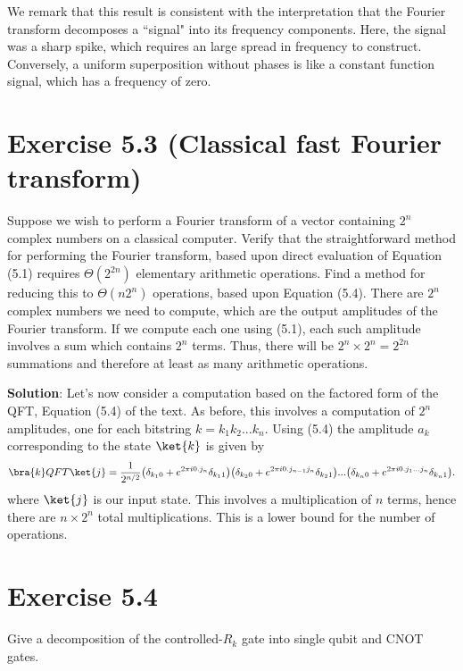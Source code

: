 \documentclass{book}
\begin{document}
    We remark that this result is consistent with the interpretation that the Fourier transform decomposes a ``signal" into its frequency components. Here, the signal was a sharp spike, which requires an large spread in frequency to construct. Conversely, a uniform superposition without phases is like a constant function signal, which has a frequency of zero. 

\section*{Exercise 5.3 (Classical fast Fourier transform)} 
    Suppose we wish to perform a Fourier transform of a vector containing $2^n$ complex numbers on a classical computer. Verify that the straightforward method for performing the Fourier transform, based upon direct evaluation of Equation (5.1) requires $\Theta(2^{2n})$ elementary arithmetic operations. Find a method for reducing this to $\Theta(n2^n)$ operations, based upon Equation (5.4).
    There are $2^n$ complex numbers we need to compute, which are the output amplitudes of the Fourier transform. If we compute each one using (5.1), each such amplitude involves a sum which contains $2^n$ terms. Thus, there will be $2^n \times 2^n = 2^{2n}$ summations and therefore at least as many arithmetic operations.
    
    \textbf{Solution}: Let's now consider a computation based on the factored form of the QFT, Equation (5.4) of the text. As before, this involves a computation of $2^n$ amplitudes, one for each bitstring $k = k_1k_2...k_n$. Using (5.4) the amplitude $a_{k}$ corresponding to the state $\ket{k}$ is given by
    \begin{align}
        \bra{k}QFT\ket{j} = \frac{1}{2^{n/2}}\big(\delta_{k_1 0}+e^{2\pi i0.j_n}\delta_{k_1 1}\big)\big(\delta_{k_2 0}+e^{2\pi i0.j_{n-1}j_n}\delta_{k_2 1}\big)...\big(\delta_{k_n 0}+e^{2\pi i0.j_1...j_n}\delta_{k_n 1}\big).
    \end{align}
    where $\ket{j}$ is our input state. This involves a multiplication of $n$ terms, hence there are $n\times 2^n$ total multiplications. This is a lower bound for the number of operations. 

\section*{Exercise 5.4}
    Give a decomposition of the controlled-$R_k$ gate into single qubit and $\mathrm{CNOT}$ gates.
    
\end{document}
